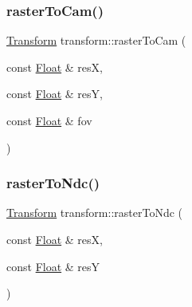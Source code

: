 \mbox{\label{namespacetransform_abe438e24da370c1a21b19492545f15ca}} 
\subsubsection{\texorpdfstring{rasterToCam()}{rasterToCam()}}
{\footnotesize\ttfamily \mbox{\hyperlink{classtransform_1_1Transform}{Transform}} transform\+::raster\+To\+Cam (\begin{DoxyParamCaption}\item[{const \mbox{\hyperlink{cyclop_8hpp_a07afd7094cb489cbd514c76e6f55d34f}{Float}} \&}]{resX,  }\item[{const \mbox{\hyperlink{cyclop_8hpp_a07afd7094cb489cbd514c76e6f55d34f}{Float}} \&}]{resY,  }\item[{const \mbox{\hyperlink{cyclop_8hpp_a07afd7094cb489cbd514c76e6f55d34f}{Float}} \&}]{fov }\end{DoxyParamCaption})}

\mbox{\label{namespacetransform_add6a8997ee9fc1593a97ec851a7e3d2e}} 
\subsubsection{\texorpdfstring{rasterToNdc()}{rasterToNdc()}}
{\footnotesize\ttfamily \mbox{\hyperlink{classtransform_1_1Transform}{Transform}} transform\+::raster\+To\+Ndc (\begin{DoxyParamCaption}\item[{const \mbox{\hyperlink{cyclop_8hpp_a07afd7094cb489cbd514c76e6f55d34f}{Float}} \&}]{resX,  }\item[{const \mbox{\hyperlink{cyclop_8hpp_a07afd7094cb489cbd514c76e6f55d34f}{Float}} \&}]{resY }\end{DoxyParamCaption})}

\mbox{\label{namespacetransform_a6d009baa6f7b018a5f0d31a864380ec6}} 
